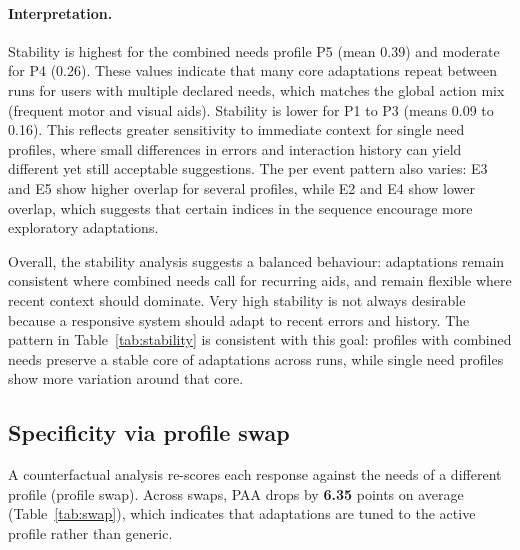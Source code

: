 \paragraph{Interpretation.}
Stability is highest for the combined needs profile P5 (mean 0.39) and moderate for P4 (0.26). These values indicate that many core adaptations repeat between runs for users with multiple declared needs, which matches the global action mix (frequent motor and visual aids). Stability is lower for P1 to P3 (means 0.09 to 0.16). This reflects greater sensitivity to immediate context for single need profiles, where small differences in errors and interaction history can yield different yet still acceptable suggestions. The per event pattern also varies: E3 and E5 show higher overlap for several profiles, while E2 and E4 show lower overlap, which suggests that certain indices in the sequence encourage more exploratory adaptations.

Overall, the stability analysis suggests a balanced behaviour: adaptations remain consistent where combined needs call for recurring aids, and remain flexible where recent context should dominate. Very high stability is not always desirable because a responsive system should adapt to recent errors and history. The pattern in Table~\ref{tab:stability} is consistent with this goal: profiles with combined needs preserve a stable core of adaptations across runs, while single need profiles show more variation around that core.



\subsection{Specificity via profile swap}
\label{sec:profile-swap}
A counterfactual analysis re-scores each response against the needs of a different profile (profile swap). Across swaps, PAA drops by \textbf{6.35} points on average (Table~\ref{tab:swap}), which indicates that adaptations are tuned to the active profile rather than generic.

